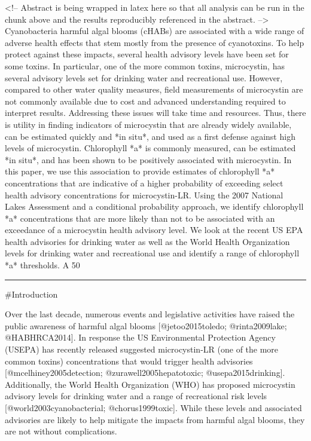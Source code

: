 <!-- Abstract is being wrapped in latex here so that all analysis can be run in the chunk above and the results reproducibly referenced in the abstract. -->
Cyanobacteria harmful algal blooms (cHABs) are associated with a wide range of adverse health effects that stem mostly from the presence of cyanotoxins.  To help protect against these impacts, several health advisory levels have been set for some toxins.  In particular, one of the more common toxins, microcystin, has several advisory levels set for drinking water and recreational use.  However, compared to other water quality measures, field measurements of microcystin are not commonly available due to cost and advanced understanding required to interpret results.  Addressing these issues will take time and resources.  Thus, there is utility in finding indicators of microcystin that are already widely available, can be estimated quickly and *in situ*, and used as a first defense against high levels of microcystin.  Chlorophyll *a* is commonly measured, can be estimated *in situ*, and has been shown to be positively associated with microcystin.  In this paper, we use this association to provide estimates of chlorophyll *a* concentrations that are indicative of a higher probability of exceeding select health advisory concentrations for microcystin-LR.  Using the 2007 National Lakes Assessment and a conditional probability approach, we identify chlorophyll *a* concentrations that are more likely than not to be associated with an exceedance of a microcystin health advisory level.  We look at the recent US EPA health advisories for drinking water as well as the World Health Organization levels for drinking water and recreational use and identify a range of chlorophyll *a* thresholds.  A 50%

\vspace{3mm}\hrule
\doublespace

#Introduction

Over the last decade, numerous events and legislative activities have raised the public awareness of harmful algal blooms [@jetoo2015toledo; @rinta2009lake; @HABHRCA2014]. In response the US Environmental Protection Agency (USEPA) has recently released suggested microcystin-LR (one of the more common toxins) concentrations that would trigger health advisories [@mcelhiney2005detection; @zurawell2005hepatotoxic; @usepa2015drinking].  Additionally, the World Health Organization (WHO) has proposed microcystin advisory levels for drinking water and a range of recreational risk levels [@world2003cyanobacterial; @chorus1999toxic].   While these levels and associated advisories are likely to help mitigate the impacts from harmful algal blooms, they are not without complications.  


